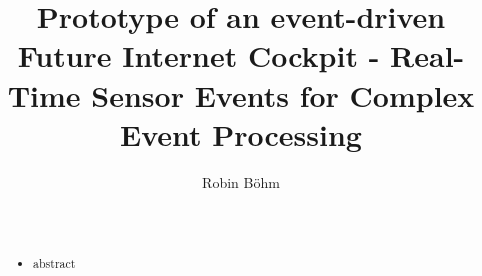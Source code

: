 \documentclass{acm_proc_article-sp}
\begin{document}
\title{Prototype of an event-driven Future Internet Cockpit -  Real-Time Sensor Events for Complex Event Processing}

%
%
%
%
%

%
\author{
%
%
\alignauthor
Robin B\"ohm\\
       \\
       \\
}

\maketitle
\begin{abstract}

\begin{itemize}
	\item abstract
\end{itemize}

\end{abstract}
\end{document}
